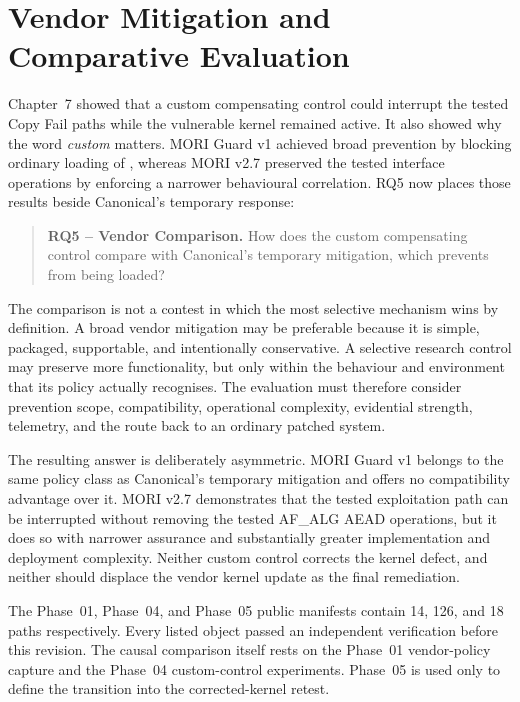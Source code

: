 \section{Vendor Mitigation and Comparative Evaluation}
\label{sec:vendor-mitigation}
\graphicspath{{../evidence/}{evidence/}}

Chapter~7 showed that a custom compensating control could interrupt the tested
Copy Fail paths while the vulnerable kernel remained active. It also showed why
the word \emph{custom} matters. MORI Guard v1 achieved broad prevention by
blocking ordinary loading of , whereas MORI v2.7 preserved
the tested interface operations by enforcing a narrower behavioural
correlation. RQ5 now places those results beside Canonical's temporary response:

\begin{quote}
\textbf{RQ5 -- Vendor Comparison.} How does the custom compensating control
compare with Canonical's temporary mitigation, which prevents
 from being loaded?
\end{quote}

The comparison is not a contest in which the most selective mechanism wins by
definition. A broad vendor mitigation may be preferable because it is simple,
packaged, supportable, and intentionally conservative. A selective research
control may preserve more functionality, but only within the behaviour and
environment that its policy actually recognises. The evaluation must therefore
consider prevention scope, compatibility, operational complexity, evidential
strength, telemetry, and the route back to an ordinary patched system.

The resulting answer is deliberately asymmetric. MORI Guard v1 belongs to the
same policy class as Canonical's temporary mitigation and offers no compatibility
advantage over it. MORI v2.7 demonstrates that the tested exploitation path can
be interrupted without removing the tested AF\_ALG AEAD operations, but it does
so with narrower assurance and substantially greater implementation and
deployment complexity. Neither custom control corrects the kernel defect, and
neither should displace the vendor kernel update as the final remediation.

\begin{evidencebox}
The Phase~01, Phase~04, and Phase~05 public manifests contain 14, 126, and 18
paths respectively. Every listed object passed an independent
 verification before this revision. The causal comparison
itself rests on the Phase~01 vendor-policy capture and the Phase~04 custom-control
experiments. Phase~05 is used only to define the transition into the
corrected-kernel retest.
\end{evidencebox}

